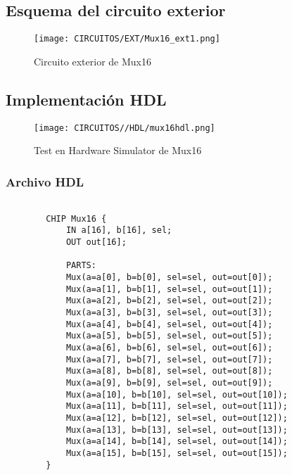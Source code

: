 \documentclass[12pt]{article}
\begin{document}
    \subsection{Esquema del circuito exterior}
        \begin{figure}[H]
            \centering
            \texttt{[image: CIRCUITOS/EXT/Mux16\_ext1.png]}            
            \caption{Circuito exterior de Mux16 \cite{circuitverse}}
            \label{fig:mux16_ext}
        \end{figure}
    \subsection{Implementación HDL}
        \begin{figure}[H]
            \centering
            \texttt{[image: CIRCUITOS//HDL/mux16hdl.png]}
            \caption{Test en Hardware Simulator de Mux16 \cite{nand2tetris}}
            \label{fig:hdlmux16}
        \end{figure}
        \subsubsection{Archivo HDL}
            \begin{lstlisting}
                
        CHIP Mux16 {
            IN a[16], b[16], sel;
            OUT out[16];
        
            PARTS:
            Mux(a=a[0], b=b[0], sel=sel, out=out[0]);
            Mux(a=a[1], b=b[1], sel=sel, out=out[1]);
            Mux(a=a[2], b=b[2], sel=sel, out=out[2]);
            Mux(a=a[3], b=b[3], sel=sel, out=out[3]);
            Mux(a=a[4], b=b[4], sel=sel, out=out[4]);
            Mux(a=a[5], b=b[5], sel=sel, out=out[5]);
            Mux(a=a[6], b=b[6], sel=sel, out=out[6]);
            Mux(a=a[7], b=b[7], sel=sel, out=out[7]);
            Mux(a=a[8], b=b[8], sel=sel, out=out[8]);
            Mux(a=a[9], b=b[9], sel=sel, out=out[9]);
            Mux(a=a[10], b=b[10], sel=sel, out=out[10]);
            Mux(a=a[11], b=b[11], sel=sel, out=out[11]);
            Mux(a=a[12], b=b[12], sel=sel, out=out[12]);
            Mux(a=a[13], b=b[13], sel=sel, out=out[13]);
            Mux(a=a[14], b=b[14], sel=sel, out=out[14]);
            Mux(a=a[15], b=b[15], sel=sel, out=out[15]);
        }
            \end{lstlisting}
    \newpage

\end{document}
